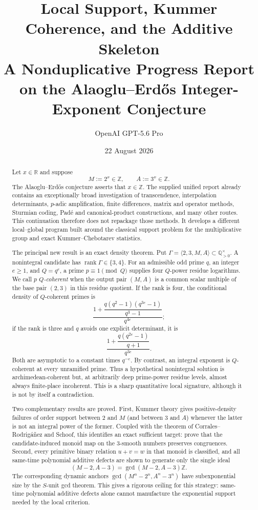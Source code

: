 \documentclass[11pt]{article}
\title{\textbf{Local Support, Kummer Coherence, and the Additive Skeleton}\\[4pt]
\large A Nonduplicative Progress Report on the Alaoglu--Erd\H{o}s Integer-Exponent Conjecture}
\author{OpenAI GPT-5.6 Pro}
\date{22 August 2026}
\theoremstyle{definition}
\theoremstyle{remark}
\newcommand{\Q}{\mathbb{Q}}
\newcommand{\Z}{\mathbb{Z}}
\newcommand{\R}{\mathbb{R}}
\newcommand{\rank}{\operatorname{rank}}
\begin{document}
\maketitle

\begin{abstract}
Let $x\in\R$ and suppose
\[
        M:=2^x\in\Z,\qquad A:=3^x\in\Z.
\]
The Alaoglu--Erd\H{o}s conjecture asserts that $x\in\Z$.  The supplied unified report already
contains an exceptionally broad investigation of transcendence, interpolation determinants,
$p$-adic amplification, finite differences, matrix and operator methods, Sturmian coding,
Pad\'e and canonical-product constructions, and many other routes.  This continuation therefore
does not repackage those methods.  It develops a different local--global program built around
the classical support problem for the multiplicative group and exact Kummer--Chebotarev
statistics.

The principal new result is an exact density theorem.  Put
$\Gamma=\langle 2,3,M,A\rangle\subset\Q_{>0}^{\times}$.  A nonintegral candidate has
$\rank\Gamma\in\{3,4\}$.  For an admissible odd prime $q$, an integer $e\ge1$, and
$Q=q^e$, a prime $p\equiv1\pmod Q$ supplies four $Q$-power residue logarithms.  We call
$p$ \emph{$Q$-coherent} when the output pair $(M,A)$ is a common scalar multiple of the
base pair $(2,3)$ in this residue quotient.  If the rank is four, the conditional density of
$Q$-coherent primes is
\[
 \frac{1+\dfrac{q(q^2-1)(q^{3e}-1)}{q^3-1}}{q^{4e}};
\]
if the rank is three and $q$ avoids one explicit determinant, it is
\[
 \frac{1+\dfrac{q(q^{2e}-1)}{q+1}}{q^{3e}}.
\]
Both are asymptotic to a constant times $q^{-e}$.  By contrast, an integral exponent is
$Q$-coherent at every unramified prime.  Thus a hypothetical nonintegral solution is
archimedean-coherent but, at arbitrarily deep prime-power residue levels, almost always
finite-place incoherent.  This is a sharp quantitative local signature, although it is not by
itself a contradiction.

Two complementary results are proved.  First, Kummer theory gives positive-density failures of
order support between $2$ and $M$ (and between $3$ and $A$) whenever the latter is not an
integral power of the former.  Coupled with the theorem of Corrales--Rodrig\'a\~nez and Schoof,
this identifies an exact sufficient target: prove that the candidate-induced monoid map on the
$3$-smooth numbers preserves congruences.  Second, every primitive binary relation
$u+v=w$ in that monoid is classified, and all same-time polynomial additive defects are shown
to generate only the single ideal
\[
       (M-2,A-3)=\gcd(M-2,A-3)\Z.
\]
The corresponding dynamic anchors
$\gcd(M^n-2^n,A^n-3^n)$ have subexponential size by the $S$-unit gcd theorem.  This gives a
rigorous ceiling for this strategy: same-time polynomial additive defects alone cannot
manufacture the exponential support needed by the local criterion.


\end{abstract}
\end{document}
